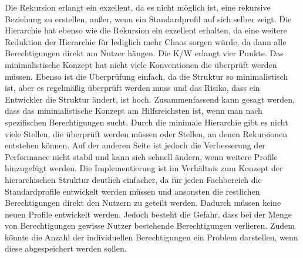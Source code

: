 Die Rekursion erlangt ein exzellent, da es nicht möglich ist, eine rekursive Beziehung zu erstellen, außer, wenn ein Standardprofil auf sich selber zeigt.
Die Hierarchie hat ebenso wie die Rekursion ein exzellent erhalten, da eine weitere Reduktion der Hierarchie für lediglich mehr Chaos sorgen würde, da dann alle Berechtigungen direkt am Nutzer hängen.
Die \ac{K/W} erlangt vier Punkte. 
Das minimalistische Konzept hat nicht viele Konventionen die überprüft werden müssen. Ebenso ist die Überprüfung einfach, da die Struktur so minimalistisch ist, aber es regelmäßig überprüft werden muss und das Risiko, dass ein Entwickler die Struktur ändert, ist hoch.
\newline
\newline
Zusammenfassend kann gesagt werden, dass das minimalistische Konzept am Hilfsreichsten ist, wenn man nach spezifischen Berechtigungen sucht.
Durch die minimale Hierarchie gibt es nicht viele Stellen, die überprüft werden müssen oder Stellen, an denen Rekursionen entstehen können.
Auf der anderen Seite ist jedoch die Verbesserung der Performance nicht stabil und kann sich schnell ändern, wenn weitere Profile hinzugefügt werden.
Die Implementierung ist im Verhältnis zum Konzept der hierarchischen Struktur deutlich einfacher, da für jeden Fachbereich die Standardprofile entwickelt werden müssen und ansonsten die restlichen Berechtigungen direkt den Nutzern zu geteilt werden. Dadurch müssen keine neuen Profile entwickelt werden.
Jedoch besteht die Gefahr, dass bei der Menge von Berechtigungen gewisse Nutzer bestehende Berechtigungen verlieren.
Zudem könnte die Anzahl der individuellen Berechtigungen ein Problem darstellen, wenn diese abgespeichert werden sollen.

